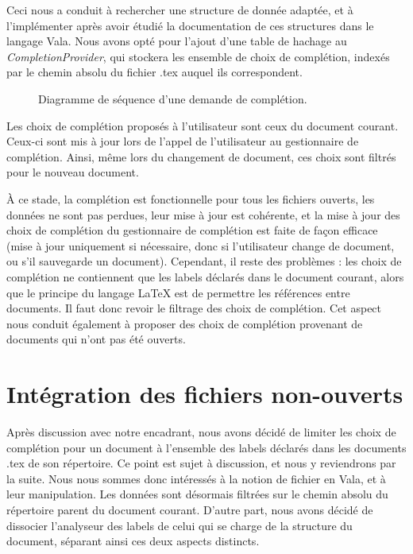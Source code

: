 \documentclass[a4paper,11pt]{report}
\begin{document}
Ceci nous a conduit à rechercher une structure de donnée adaptée, et à l'implémenter après avoir étudié la documentation de ces structures dans le langage Vala.
Nous avons opté pour l'ajout d'une table de hachage au \textit{CompletionProvider}, qui stockera les ensemble de choix de complétion, indexés par le chemin absolu du fichier .tex auquel ils correspondent.

\begin{figure}[h]
\label{fig:filtering_completion}
\centering

\caption{Diagramme de séquence d'une demande de complétion.}
\end{figure}

Les choix de complétion proposés à l'utilisateur sont ceux du document courant.
Ceux-ci sont mis à jour lors de l'appel de l'utilisateur au gestionnaire de complétion. Ainsi, même lors du changement de document, ces choix sont filtrés pour le nouveau document.

À ce stade, la complétion est fonctionnelle pour tous les fichiers ouverts, les données ne sont pas perdues, leur mise à jour est cohérente, et la mise à jour des choix de complétion du gestionnaire de complétion est faite de façon efficace (mise à jour uniquement si nécessaire, donc si l'utilisateur change de document, ou s'il sauvegarde un document).
Cependant, il reste des problèmes : les choix de complétion ne contiennent que les labels déclarés dans le document courant, alors que le principe du langage \LaTeX{} est de permettre les références entre documents.
Il faut donc revoir le filtrage des choix de complétion.
Cet aspect nous conduit également à proposer des choix de complétion provenant de documents qui n'ont pas été ouverts.

\section{Intégration des fichiers non-ouverts}
Après discussion avec notre encadrant, nous avons décidé de limiter les choix de complétion pour un document à l'ensemble des labels déclarés dans les documents .tex de son répertoire.
Ce point est sujet à discussion, et nous y reviendrons par la suite.
Nous nous sommes donc intéressés à la notion de fichier en Vala, et à leur manipulation.
Les données sont désormais filtrées sur le chemin absolu du répertoire parent du document courant.
D'autre part, nous avons décidé de dissocier l'analyseur des labels de celui qui se charge de la structure du document, séparant ainsi ces deux aspects distincts.
\end{document}
